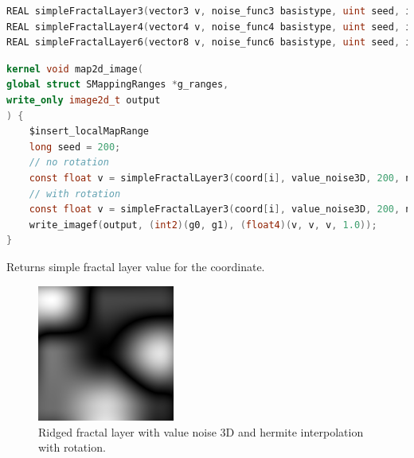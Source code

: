 \begin{lstlisting}[caption={Definition of simple fractal layer functions},label={lst:simple_fractal_layer_definition},language=OpenCL]
REAL simpleFractalLayer3(vector3 v, noise_func3 basistype, uint seed, interp_func interp, REAL layerscale, REAL layerfreq, bool rot, REAL angle, REAL ax, REAL ay, REAL az);
REAL simpleFractalLayer4(vector4 v, noise_func4 basistype, uint seed, interp_func interp, REAL layerscale, REAL layerfreq, bool rot, REAL angle, REAL ax, REAL ay, REAL az);
REAL simpleFractalLayer6(vector8 v, noise_func6 basistype, uint seed, interp_func interp, REAL layerscale, REAL layerfreq, bool rot, REAL angle, REAL ax, REAL ay, REAL az);
\end{lstlisting}

\begin{lstlisting}[caption={Example for simple fractal layer functions},label={lst:simple_fractal_layer_example},language=OpenCL]
kernel void map2d_image(
global struct SMappingRanges *g_ranges,
write_only image2d_t output
) {
    $insert_localMapRange
    long seed = 200;
    // no rotation
    const float v = simpleFractalLayer3(coord[i], value_noise3D, 200, noInterp, 1, 0.125, false, 0.0, 0.0, 0.0, 0.0);
    // with rotation
    const float v = simpleFractalLayer3(coord[i], value_noise3D, 200, noInterp, 1, 0.125, true, 1.57, 1.0, 0.0, 0.0);
    write_imagef(output, (int2)(g0, g1), (float4)(v, v, v, 1.0));
}
\end{lstlisting}

Returns simple fractal layer value for the coordinate.

\begin{figure}[h]
\centering
\includegraphics[width=0.4\textwidth]{out/simpleRidgedLayer3/simpleRidgedLayer3_value_noise3D_hermiteInterp_rot.png}
\caption{Ridged fractal layer with value noise 3D and hermite interpolation with rotation.}
\label{fig:ridged_fractal_layer3_value_noise3D_hermiteInterp_rot}
\end{figure}


